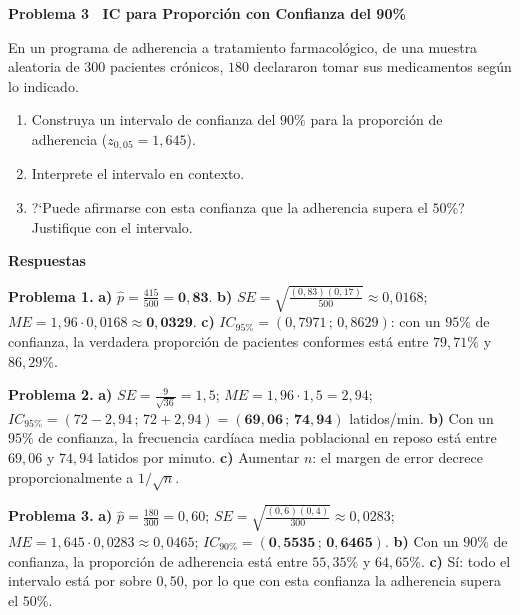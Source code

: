 \documentclass[10pt,letterpaper]{article}
\newcommand{\seccion}[1]{%
  \vspace{2pt}%
  \begin{tcolorbox}[enhanced,colback=white,colframe=black,arc=0pt,boxrule=0pt,
    leftrule=2pt,left=6pt,right=6pt,top=1pt,bottom=1pt]
    {\normalsize\bfseries\sffamily #1}
  \end{tcolorbox}%
  \vspace{1pt}%
}
\begin{document}
\seccion{Problema 3 \textendash\ IC para Proporci\'on con Confianza del 90\%}

\noindent\sffamily\small En un programa de adherencia a tratamiento farmacol\'ogico, de una muestra aleatoria de $300$ pacientes cr\'onicos, $180$ declararon tomar sus medicamentos seg\'un lo indicado.

\begin{enumerate}[leftmargin=1.2cm, label=\textbf{\alph*)}, itemsep=2pt, topsep=2pt]
  \item Construya un intervalo de confianza del $90\%$ para la proporci\'on de adherencia ($z_{0{,}05}=1{,}645$).
  \item Interprete el intervalo en contexto.
  \item ?`Puede afirmarse con esta confianza que la adherencia supera el $50\%$? Justifique con el intervalo.
\end{enumerate}

\newpage

\seccion{Respuestas}

\small\sffamily
\textbf{Problema 1.}
\textbf{a)} $\hat{p}=\frac{415}{500}=\mathbf{0{,}83}$.
\textbf{b)} $SE=\sqrt{\frac{(0{,}83)(0{,}17)}{500}}\approx0{,}0168$; $ME=1{,}96\cdot0{,}0168\approx\mathbf{0{,}0329}$.
\textbf{c)} $IC_{95\%}=(0{,}7971\,;\,0{,}8629)$: con un $95\%$ de confianza, la verdadera proporci\'on de pacientes conformes est\'a entre $79{,}71\%$ y $86{,}29\%$.

\medskip
\textbf{Problema 2.}
\textbf{a)} $SE=\frac{9}{\sqrt{36}}=1{,}5$; $ME=1{,}96\cdot1{,}5=2{,}94$; $IC_{95\%}=(72-2{,}94\,;\,72+2{,}94)=(\mathbf{69{,}06\,;\,74{,}94})$ latidos/min.
\textbf{b)} Con un $95\%$ de confianza, la frecuencia card\'iaca media poblacional en reposo est\'a entre $69{,}06$ y $74{,}94$ latidos por minuto.
\textbf{c)} Aumentar $n$: el margen de error decrece proporcionalmente a $1/\sqrt{n}$.

\medskip
\textbf{Problema 3.}
\textbf{a)} $\hat{p}=\frac{180}{300}=0{,}60$; $SE=\sqrt{\frac{(0{,}6)(0{,}4)}{300}}\approx0{,}0283$; $ME=1{,}645\cdot0{,}0283\approx0{,}0465$; $IC_{90\%}=(\mathbf{0{,}5535\,;\,0{,}6465})$.
\textbf{b)} Con un $90\%$ de confianza, la proporci\'on de adherencia est\'a entre $55{,}35\%$ y $64{,}65\%$.
\textbf{c)} S\'i: todo el intervalo est\'a por sobre $0{,}50$, por lo que con esta confianza la adherencia supera el $50\%$.
\end{document}
